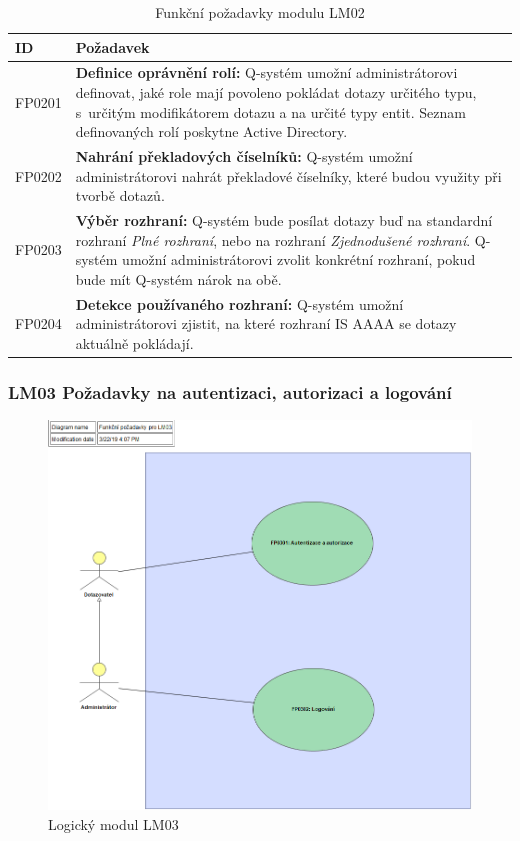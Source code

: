 \documentclass[thesis=M,czech]{FITthesis}[2019/12/23]
\begin{document}
\begin{table}[H]
	\centering
	\begin{tabular}{|p{}|p{}|}
		\hline
  		{\textbf{ID}} & {\textbf{Požadavek}} \\
  		\hline \hline
  		FP0201 & \textbf{Definice oprávnění rolí:} Q-systém umožní administrátorovi definovat, jaké role mají povoleno pokládat dotazy určitého typu, s~určitým modifikátorem dotazu a na určité typy entit. Seznam definovaných rolí poskytne Active Directory.  \\ \hline
		FP0202 & \textbf{Nahrání překladových číselníků:} Q-systém umožní administrátorovi nahrát překladové číselníky, které budou využity při tvorbě dotazů. \\ \hline
		FP0203 & \textbf{Výběr rozhraní:} Q-systém bude posílat dotazy buď na standardní rozhraní \textit{Plné rozhraní}, nebo na rozhraní \textit{Zjednodušené rozhraní}. Q-systém umožní administrátorovi zvolit konkrétní rozhraní, pokud bude mít Q-systém nárok na obě. \\ \hline
		FP0204 & \textbf{Detekce používaného rozhraní:} Q-systém umožní administrátorovi zjistit, na které rozhraní IS AAAA se dotazy aktuálně pokládají. \\ \hline
	\end{tabular}
 	\caption{Funkční požadavky modulu LM02}
\label{tab:Funkční požadavky modulu LM02}
\end{table}

\subsubsection{LM03 Požadavky na autentizaci, autorizaci a logování}
\label{LM03}
\begin{figure}[H]
  \centering
  \includegraphics[width=\textwidth]{res/design/Funkční požadavky pro LM03.png}
  \caption{Logický modul LM03}
  \label{fig:Logický modul LM03}
\end{figure}
\end{document}
